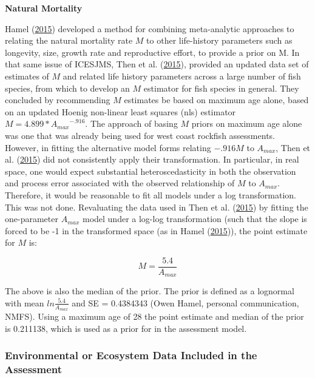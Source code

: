 \documentclass[12pt,]{article}
\begin{document}
\vspace{.5cm} \textbf{Natural Mortality}

Hamel (\protect\hyperlink{ref-Hamel2015}{2015}) developed a method for
combining meta-analytic approaches to relating the natural mortality
rate \(M\) to other life-history parameters such as longevity, size,
growth rate and reproductive effort, to provide a prior on M. In that
same issue of ICESJMS, Then et al.
(\protect\hyperlink{ref-Then2015}{2015}), provided an updated data set
of estimates of \(M\) and related life history parameters across a large
number of fish species, from which to develop an \(M\) estimator for
fish species in general. They concluded by recommending \(M\) estimates
be based on maximum age alone, based on an updated Hoenig non-linear
least squares (nls) estimator \(M= 4.899*{A_{max}}^{-.916}\). The
approach of basing \(M\) priors on maximum age alone was one that was
already being used for west coast rockfish assessments. However, in
fitting the alternative model forms relating \(-.916M\) to \(A_{max}\),
Then et al. (\protect\hyperlink{ref-Then2015}{2015}) did not
consistently apply their transformation. In particular, in real space,
one would expect substantial heteroscedasticity in both the observation
and process error associated with the observed relationship of \(M\) to
\(A_{max}\). Therefore, it would be reasonable to fit all models under a
log transformation. This was not done. Revaluating the data used in Then
et al. (\protect\hyperlink{ref-Then2015}{2015}) by fitting the
one-parameter \(A_{max}\) model under a log-log transformation (such
that the slope is forced to be -1 in the transformed space (as in Hamel
(\protect\hyperlink{ref-Hamel2015}{2015})), the point estimate for \(M\)
is:

\begin{equation}
M = \frac{5.4}{A_{max}}
\end{equation}

The above is also the median of the prior. The prior is defined as a
lognormal with mean \(ln\frac{5.4}{A_{max}}\) and SE = 0.4384343 (Owen
Hamel, personal communication, NMFS). Using a maximum age of 28 the
point estimate and median of the prior is 0.211138, which is used as a
prior for in the assessment model.

\vspace{.5cm}

\subsubsection{Environmental or Ecosystem Data Included in the
Assessment}\label{environmental-or-ecosystem-data-included-in-the-assessment}
\end{document}
